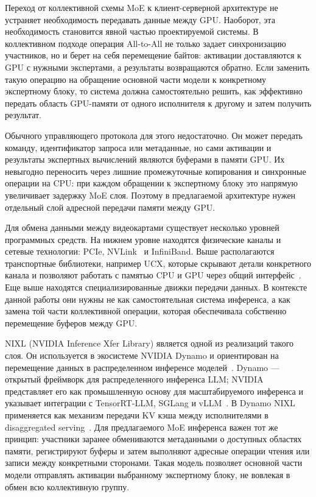 Переход от коллективной схемы MoE к клиент-серверной архитектуре не устраняет необходимость передавать данные между GPU. Наоборот, эта необходимость становится явной частью проектируемой системы. В коллективном подходе операция All-to-All не только задает синхронизацию участников, но и берет на себя перемещение байтов: активации доставляются к GPU с нужными экспертами, а результаты возвращаются обратно. Если заменить такую операцию на обращение основной части модели к конкретному экспертному блоку, то система должна самостоятельно решить, как эффективно передать область GPU-памяти от одного исполнителя к другому и затем получить результат.

Обычного управляющего протокола для этого недостаточно. Он может передать команду, идентификатор запроса или метаданные, но сами активации и результаты экспертных вычислений являются буферами в памяти GPU. Их невыгодно переносить через лишние промежуточные копирования и синхронные операции на CPU: при каждом обращении к экспертному блоку это напрямую увеличивает задержку MoE слоя. Поэтому в предлагаемой архитектуре нужен отдельный слой адресной передачи памяти между GPU.

Для обмена данными между видеокартами существует несколько уровней программных средств. На нижнем уровне находятся физические каналы и сетевые технологии: PCIe, NVLink~\cite{nvidiaNvlink} и InfiniBand. Выше располагаются транспортные библиотеки, например UCX, которые скрывают детали конкретного канала и позволяют работать с памятью CPU и GPU через общий интерфейс~\cite{openucxFeatures}. Еще выше находятся специализированные движки передачи данных. В контексте данной работы они нужны не как самостоятельная система инференса, а как замена той части коллективной операции, которая обеспечивала собственно перемещение буферов между GPU.

NIXL (NVIDIA Inference Xfer Library) является одной из реализаций такого слоя. Он используется в экосистеме NVIDIA Dynamo и ориентирован на перемещение данных в распределенном инференсе моделей~\cite{nvidiaNixl}. Dynamo --- открытый фреймворк для распределенного инференса LLM; NVIDIA представляет его как промышленную основу для масштабируемого инференса и указывает интеграции с TensorRT-LLM, SGLang и vLLM~\cite{nvidiaDynamoProduction}. В Dynamo NIXL применяется как механизм передачи KV кэша между исполнителями в disaggregated serving~\cite{nvidiaDynamoDisaggregatedServing}. Для предлагаемого MoE инференса важен тот же принцип: участники заранее обмениваются метаданными о доступных областях памяти, регистрируют буферы и затем выполняют адресные операции чтения или записи между конкретными сторонами. Такая модель позволяет основной части модели отправлять активации выбранному экспертному блоку, не вовлекая в обмен всю коллективную группу.

